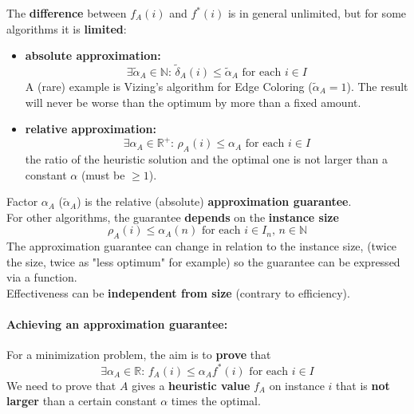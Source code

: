 \documentclass[11pt]{article}
\begin{document}
	The \textbf{difference} between $f_A (i)$ and $f^\ast(i)$ is in general unlimited, but for some algorithms it is \textbf{limited}:
	\begin{itemize}
		\item \textbf{absolute approximation:}
		$$ \exists \tilde{\alpha}_A \in \mathbb{N} : \, \tilde{\delta}_A (i) \leq \tilde{\alpha}_A \text{ for each } i \in I $$
		A (rare) example is Vizing's algorithm for Edge Coloring ($\tilde{\alpha}_A = 1$). The result will never be worse than the optimum by more than a fixed amount.
		\item \textbf{relative approximation:}
		$$ \exists \alpha_A \in \mathbb{R}^+ : \, \rho_A (i) \leq \alpha_A \text{ for each } i \in I $$
		the ratio of the heuristic solution and the optimal one is not larger than a constant $\alpha$ (must be $\geq 1$).
	\end{itemize}
	Factor $\alpha_A$ ($\tilde{\alpha}_A$) is the relative (absolute) \textbf{approximation guarantee}.\\
	
	For other algorithms, the guarantee \textbf{depends} on the \textbf{instance size}
	$$ \rho_A (i) \leq \alpha_A (n) \text{ for each } i \in I_n, \, n \in \mathbb{N} $$
	The approximation guarantee can change in relation to the instance size, (twice the size, twice as "less optimum" for example) so the guarantee can be expressed via a function.\\
	
	Effectiveness can be \textbf{independent from size} (contrary to efficiency).\\
	
	\newpage
	
	\paragraph{Achieving an approximation guarantee:} For a minimization problem, the aim is to \textbf{prove} that
	$$ \exists \alpha_A \in \mathbb{R} : \, f_A (i) \leq \alpha_A f^\ast (i) \text{ for each } i \in I $$
	We need to prove that $A$ gives a \textbf{heuristic value} $f_A$ on instance $i$ that is \textbf{not larger} than a certain constant $\alpha$ times the optimal.\\
	
\end{document}

